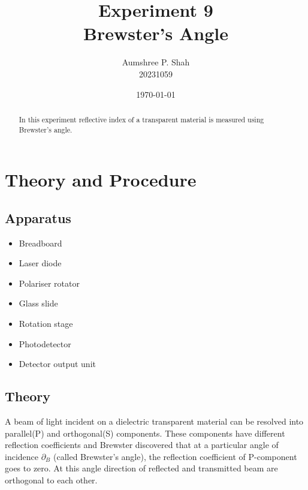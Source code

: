 \documentclass[%
sor,
 jor,
 amsmath,amssymb,
 reprint,
]{revtex4-2}
\begin{document}
\title{Experiment 9\\Brewster's Angle}

\author{Aumshree P. Shah\\20231059}
\date{\today}

\begin{abstract}
\centering
In this experiment reflective index of a transparent material is measured using Brewster's angle.
\end{abstract}


\maketitle
\section{Theory and Procedure}
\subsection{Apparatus}
\small
\begin{minipage}{0.48\textwidth}
\begin{itemize}

	\item Breadboard\item Laser diode\item Polariser rotator\item Glass slide
\end{itemize}
\end{minipage}
\begin{minipage}{0.48\textwidth}
\begin{itemize}

\item Rotation stage\item Photodetector\item Detector output unit
\end{itemize}
\end{minipage}

\subsection{Theory}
A beam of light incident on a dielectric transparent material can be resolved into parallel(P) and orthogonal(S) components. These components have different reflection coefficients and Brewster discovered that at a particular angle of incidence $\partial_B$ (called Brewster's angle), the reflection coefficient of P-component goes to zero. At this angle direction of reflected and transmitted beam are orthogonal to each other. \\
\end{document}
